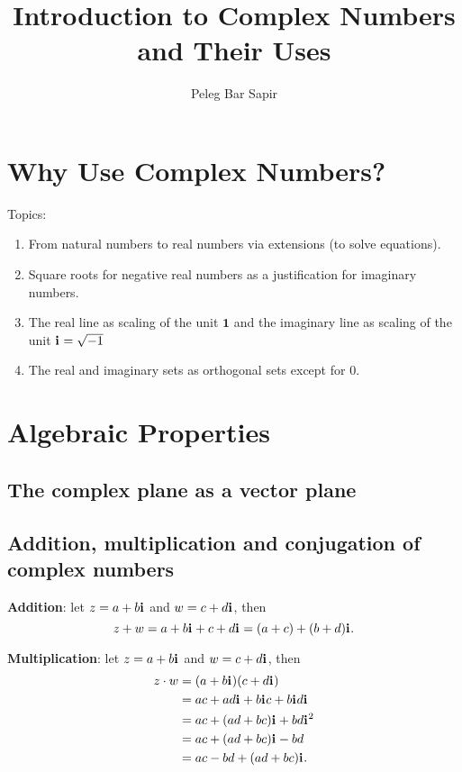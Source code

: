 \documentclass{article}
\title{Introduction to Complex Numbers and Their Uses}
\author{Peleg Bar Sapir}
\newcommand{\iu}{\mathbf{i}\mkern1mu}
\begin{document}
\maketitle

\section{Why Use Complex Numbers?}
Topics:
\begin{enumerate}
	\item From natural numbers to real numbers via extensions (to solve equations).
	\item Square roots for negative real numbers as a justification for imaginary numbers.
	\item The real line as scaling of the unit $\mathbf{1}$ and the imaginary line as scaling of the unit $\iu=\sqrt{-1}$
	\item The real and imaginary sets as orthogonal sets except for $0$.
\end{enumerate}

\section{Algebraic Properties}
\subsection{The complex plane as a vector plane}
\subsection{Addition, multiplication and conjugation of complex numbers}
\textbf{Addition}: let $z=a + b\iu$ and $w=c + d\iu$, then
\begin{equation}
	z+w = a+b\iu + c+d\iu = (a+c) + (b+d)\iu.
	\label{eq:addition_complex}
\end{equation}

\textbf{Multiplication}: let $z=a + b\iu$ and $w=c + d\iu$, then
\begin{equation}
	\begin{aligned}
		z \cdot w & = (a+b\iu)(c+d\iu)                \\
		          & = ac + ad\iu + b\iu c + b\iu d\iu \\
		          & = ac + (ad+bc)\iu + bd\iu^{2}     \\
		          & = ac + (ad+bc)\iu - bd            \\
		          & = ac-bd + (ad+bc)\iu.
	\end{aligned}
	\label{eq:multiplication_complex}
\end{equation}
\end{document}
